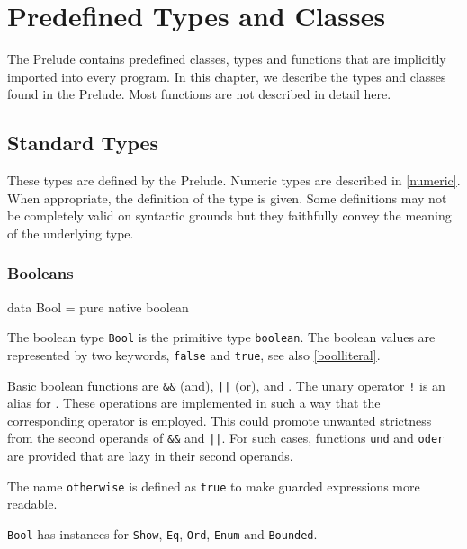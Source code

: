 \chapter{Predefined Types and Classes} \label{types}

The \frege{} Prelude contains predefined classes, types and functions that are implicitly imported into every \frege{} program. In this chapter, we describe the types and classes found in the Prelude. Most functions
are not described in detail here.


\section{Standard \frege{} Types}

These types are defined by the \frege{} Prelude. Numeric types are described in \autoref{numeric}. When appropriate,
the \frege{} definition of the type is given. Some definitions may not be completely valid on syntactic
grounds but they faithfully convey the meaning of the underlying type.


\subsection{Booleans}  \label{boolean}

\begin{code}
data Bool = pure native boolean
\end{code}

The boolean type \texttt{Bool} is the primitive \java{} type \texttt{boolean}. 
The boolean values are represented by two keywords, \texttt{false} and \texttt{true}, see also \autoref{boolliteral}.

Basic boolean functions are \texttt{\&\&} (and), \texttt{||} (or), and . 
The unary operator \texttt{!} is an alias for . 
These operations are implemented in such a way that the corresponding \java{} operator is employed.
This could promote unwanted strictness from the second operands of \texttt{\&\&} and \texttt{||}. For such cases, functions \texttt{und} and \texttt{oder} are provided that are lazy in their second operands.

The name \texttt{otherwise} is defined as \texttt{true} to make guarded expressions more readable.

\texttt{Bool} has instances for \texttt{Show}, \texttt{Eq}, \texttt{Ord}, \texttt{Enum} and \texttt{Bounded}.



